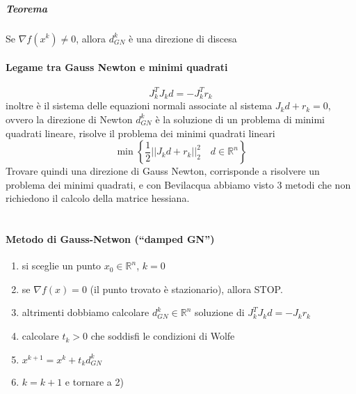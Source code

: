 \documentclass[a4paper,10pt]{article}
\begin{document}
\subparagraph{Teorema}
Se $\nabla f(x^{k}) \neq 0$, allora $d_{GN}^{k}$ è una direzione
di discesa

\paragraph{Legame tra Gauss Newton e minimi quadrati}
$$J_{k}^{T}J_kd = - J_k^{T}r_k$$
inoltre è il sistema delle equazioni normali associate al sistema
$J_kd + r_k=0 $, ovvero la direzione di Newton $d_{GN}^{k}$ è la
soluzione di un problema di minimi quadrati lineare, risolve il
problema dei minimi quadrati lineari
$$ \min \left\{ \frac{1}{2} || J_k d + r_k ||_{2}^{2} \quad d \in \mathbb{R}^{n} \right\} $$
Trovare quindi una direzione di Gauss Newton, corrisponde
a risolvere un problema dei minimi quadrati,
e con Bevilacqua abbiamo visto 3 metodi che non richiedono
il calcolo della matrice hessiana. \\ \\

\paragraph{Metodo di Gauss-Netwon (``damped GN'')}
\begin{enumerate}
\item si sceglie un punto $x_0 \in \mathbb{R}^{n}$, $k=0$
\item se $\nabla f(x)=0$ (il punto trovato è stazionario),
      allora STOP.
\item altrimenti dobbiamo calcolare $d^{k}_{GN} \in \mathbb{R}^{n}$ soluzione
      di $J_{k}^{T}J_{k}d = -J_{k}r_{k}$
\item calcolare $t_k > 0 $ che soddisfi le condizioni di Wolfe
\item $x^{k+1} = x^{k} + t_k d_{GN}^{k}$
\item $k = k+1$ e tornare a 2)
\end{enumerate}
\end{document}
